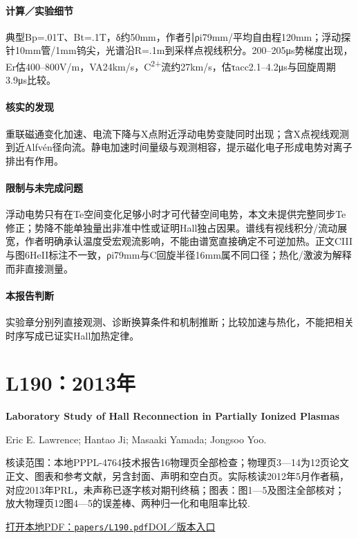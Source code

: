 \paragraph{计算／实验细节}典型Bp=.01T、Bt=.1T，δ约50mm，作者引ρi79mm/平均自由程120mm；浮动探针10mm管/1mm钨尖，光谱沿R=.1m到采样点视线积分。200–205μs势梯度出现，Er估400–800V/m，VA24km/s，C\textsuperscript{2+}流约27km/s，估τacc2.1–4.2μs与回旋周期3.9μs比较。

\paragraph{核实的发现}重联磁通变化加速、电流下降与X点附近浮动电势变陡同时出现；含X点视线观测到近Alfvén径向流。静电加速时间量级与观测相容，提示磁化电子形成电势对离子排出有作用。

\paragraph{限制与未完成问题}浮动电势只有在Te空间变化足够小时才可代替空间电势，本文未提供完整同步Te修正；势降不能单独量出非准中性或证明Hall独占因果。谱线有视线积分/流动展宽，作者明确承认温度受宏观流影响，不能由谱宽直接确定不可逆加热。正文CIII与图6HeII标注不一致，ρi79mm与C回旋半径16mm属不同口径；热化/激波为解释而非直接测量。

\paragraph{本报告判断}实验章分别列直接观测、诊断换算条件和机制推断；比较加速与热化，不能把相关时序写成已证实Hall加热定律。

\section{L190：2013年}\label{paper:L190}

\textbf{Laboratory Study of Hall Reconnection in Partially Ionized Plasmas}\citep{L190}\

Eric E. Lawrence;  Hantao Ji;  Masaaki Yamada;  Jongsoo Yoo.

\textsf{核读范围：}本地PPPL-4764技术报告16物理页全部检查；物理页3—14为12页论文正文、图表和参考文献，另含封面、声明和空白页。实际核读2012年5月作者稿，对应2013年PRL，未声称已逐字核对期刊终稿；\textsf{图表：}图1—5及图注全部核对；放大物理页12图4—5的误差棒、两种归一化和电阻率比较.

\href{run:papers/L190.pdf}{打开本地PDF：\texttt{papers/L190.pdf}}\quad\href{https://doi.org/10.1103/physrevlett.110.015001}{DOI／版本入口}


